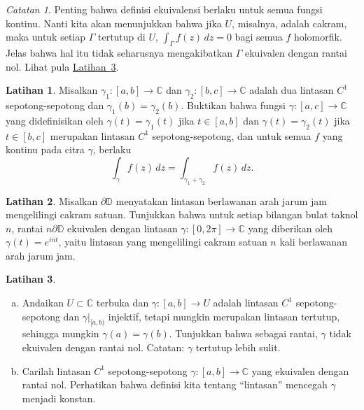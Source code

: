 \documentclass[12pt,openany]{book}
\newcommand{\C}{{\mathbb{C}}}
\newcommand{\D}{{\mathbb{D}}}
\newcommand{\myquote}[1]{``#1''}
\theoremstyle{plain}
\theoremstyle{remark}
\newtheorem{remark}[thm]{Catatan}
\theoremstyle{definition}
\newenvironment{exbox}{%
    \def\FrameCommand{\vrule width 1pt \relax\hspace{10pt}}%
    \MakeFramed{\advance\hsize-\width\FrameRestore}%
}{%
    \endMakeFramed
}
\newenvironment{exparts}{%
    \leavevmode\begin{enumerate}[a),noitemsep,topsep=0pt,parsep=0pt,partopsep=0pt]
}{%
    \end{enumerate}
}
\theoremstyle{exercise}
\newtheorem{exercise}{Latihan}[section]
\theoremstyle{example}
\newcommand{\exerciseref}[1]{\hyperref[#1]{Latihan~\ref*{#1}}}
\begin{document}
\begin{remark}
Penting bahwa definisi ekuivalensi berlaku untuk semua fungsi
kontinu.  Nanti kita akan menunjukkan bahwa jika $U$, misalnya, adalah cakram, maka untuk
setiap $\Gamma$ tertutup di $U$, $\int_\Gamma f(z) \, dz = 0$ bagi semua $f$ holomorfik.
Jelas bahwa hal itu tidak seharusnya mengakibatkan $\Gamma$ ekuivalen dengan rantai
nol.
Lihat pula \exerciseref{exercise:nonconstantnonzerochain}.
\end{remark}

\begin{exbox}
\begin{exercise}%
\label{exercise:pathsum}
Misalkan $\gamma_1 \colon [a,b] \to \C$ dan $\gamma_2 \colon [b,c] \to \C$
adalah dua lintasan $C^1$ sepotong-sepotong dan $\gamma_1(b)=\gamma_2(b)$.
Buktikan bahwa fungsi $\gamma \colon [a,c] \to
\C$ yang didefinisikan oleh $\gamma(t) = \gamma_1(t)$ jika $t \in [a,b]$ dan $\gamma(t)
= \gamma_2(t)$ jika $t \in [b,c]$ merupakan lintasan $C^1$ sepotong-sepotong, dan
untuk semua $f$ yang kontinu pada citra $\gamma$, berlaku
\begin{equation*}
\int_{\gamma} f(z)\,dz = \int_{\gamma_1 + \gamma_2} f(z) \, dz .
\end{equation*}
\end{exercise}

\begin{exercise}
Misalkan $\partial \D$ menyatakan lintasan berlawanan arah jarum jam mengelilingi cakram satuan.
Tunjukkan bahwa untuk setiap bilangan bulat taknol $n$, rantai $n \partial \D$ ekuivalen dengan
lintasan $\gamma \colon [0,2\pi] \to \C$ yang diberikan oleh $\gamma(t) = e^{int}$,
yaitu lintasan yang mengelilingi cakram satuan $n$ kali berlawanan arah jarum jam.
\end{exercise}

\begin{exercise} \label{exercise:nonconstantnonzerochain}
\begin{exparts}
\item
Andaikan $U \subset \C$ terbuka dan
$\gamma \colon [a,b] \to U$
adalah lintasan $C^1$
sepotong-sepotong dan $\gamma|_{[a,b)}$ injektif, tetapi mungkin merupakan lintasan tertutup,
sehingga mungkin $\gamma(a)=\gamma(b)$.  Tunjukkan bahwa sebagai rantai, $\gamma$ tidak ekuivalen dengan rantai nol.
Catatan: $\gamma$ tertutup lebih sulit.
\item
Carilah lintasan $C^1$ sepotong-sepotong $\gamma \colon [a,b] \to \C$
yang ekuivalen dengan rantai nol.  Perhatikan bahwa definisi kita tentang
\myquote{lintasan}
mencegah $\gamma$ menjadi konstan.
\end{exparts}
\end{exercise}
\end{exbox}
\end{document}
